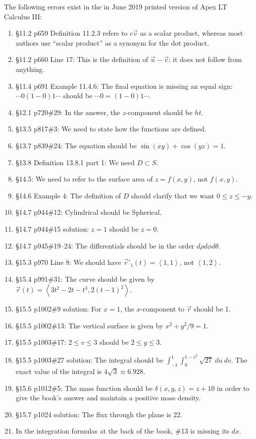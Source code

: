 \documentclass{amsart}
\newcommand{\bracket}[1]{\left\langle#1\right\rangle}
\begin{document}
\noindent
The following errors exist in the in June 2019 printed version of Apex LT Calculus III:
\begin{enumerate}
\item \S11.2 p659 Definition 11.2.3 refers to $c\vec v$ as a scalar product, whereas most authors use ``scalar product'' as a synonym for the dot product.
\item \S11.2 p660 Line 17: This is the definition of $\vec u-\vec v$; it does not follow from anything.
\item \S11.4 p691 Example 11.4.6: The final equation is missing an equal sign: $\dotsm0(1-0)1\dotsb$ should be $\dotsm0=(1-0)1\dotsb$.
\item \S12.1 p720\#29: In the answer, the $z$-component should be $ht$.
\item \S13.5 p817\#3: We need to state how the functions are defined.
\item \S13.7 p839\#24: The equation should be $\sin(xy)+\cos(yz)=1$.
\item \S13.8 Definition 13.8.1 part 1: We need $D\subset S$.
\item \S14.5: We need to refer to the surface area of $z=f(x,y)$, not $f(x,y)$.
\item \S14.6 Example 4: The definition of $D$ should clarify that we want $0\le z\le-y$.
\item \S14.7 p944\#12: Cylindrical should be Spherical.
\item \S14.7 p944\#15 solution: $z=1$ should be $z=0$.
\item \S14.7 p945\#19--24: The differentials should be in the order $d\rho d\phi d\theta$.
\item \S15.3 p970 Line 8: We should have $\vec r'_1(t)=\bracket{1,1}$, not $\bracket{1,2}$.
\item \S15.4 p991\#31: The curve should be given by $\vec r(t)=\bracket{3t^2-2t-t^3,2(t-1)^2}$.
\item \S15.5 p1002\#9 solution: For $x=1$, the $x$-component to $\vec r$ should be 1.
\item \S15.5 p1002\#13: The vertical surface is given by $x^2+y^2/9=1$.
\item \S15.5 p1003\#17: $2\le v\le3$ should be $2\le y\le3$.
\item \S15.5 p1003\#27 solution: The integral should be $\int_{-1}^1\int_0^{1-v^2}\sqrt{27}\ du\ dv$. The exact value of the integral is $4\sqrt3\approx6.928$.
\item \S15.6 p1012\#5: The mass function should be $\delta(x,y,z)=z+10$ in order to give the book's answer and maintain a positive mass density.
\item \S15.7 p1024 solution: The flux through the plane is 22.
\item In the integration formulas at the back of the book, \#13 is missing its $dx$.
\label{2019-06-00IIIplus}
\end{enumerate}
\end{document}

